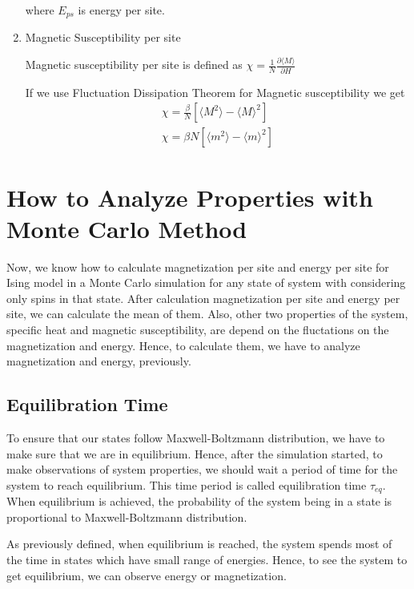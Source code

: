 \documentclass[12pt,fleqn]{report}
\begin{document}
\begin{enumerate}[start=1]
where $E_{ps}$ is energy per site.

\item Magnetic Susceptibility per site

Magnetic susceptibility per site is defined as $ \chi = \frac{1}{N} \frac{\partial \langle M \rangle}{\partial H} $ 

If we use Fluctuation Dissipation Theorem for Magnetic susceptibility we get 
\begin{gather}
\chi = \frac{\beta}{N} [ \langle M^2 \rangle - \langle M \rangle^2    ] \\
\chi = \beta N [ \langle m^2 \rangle - \langle m \rangle^2    ]
\end{gather}

\end{enumerate}

\section{How to Analyze Properties with Monte Carlo Method }

Now, we know how to calculate magnetization per site and energy per site for Ising model in a Monte Carlo simulation for any state of system with considering only spins in that state. After calculation magnetization per site and energy per site, we can calculate the mean of them. Also, other two properties of the system, specific heat and magnetic susceptibility, are depend on the fluctations on the magnetization and energy. Hence, to calculate them, we have to analyze magnetization and energy, previously. 

\subsection{Equilibration Time}

To ensure that our states follow Maxwell-Boltzmann distribution, we have to make sure that we are in equilibrium. Hence, after the simulation started, to make observations of system properties, we should wait a period of time for the system to reach equilibrium. This time period is called equilibration time $\tau_{eq}$. When equilibrium is achieved, the  probability of the system being in a state is proportional to Maxwell-Boltzmann distribution. 

As previously defined, when equilibrium is reached, the system spends most of the time in states which have small range of energies. Hence, to see the system to get equilibrium, we can observe energy or magnetization.
\end{document}
